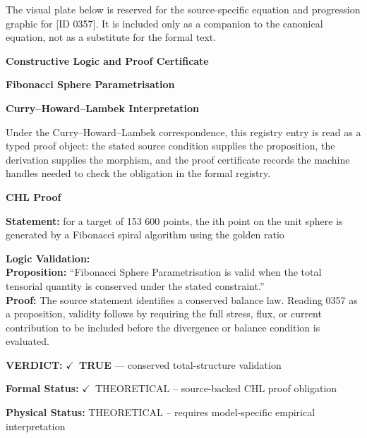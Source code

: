 \begingroup\footnotesize\sloppy
The visual plate below is reserved for the source-specific equation and progression graphic for [ID 0357]. It is included only as a companion to the canonical equation, not as a substitute for the formal text.
\par\endgroup
\ifTZPDarkEdition
{}
\fi

\clearpage
\begingroup\tzpsupportsetup
\noindent\textbf{\fontsize{10.8pt}{12.8pt}\selectfont [ID 0357] Constructive Logic and Proof Certificate}\par
\noindent\textbf{\fontsize{10pt}{12pt}\selectfont Fibonacci Sphere Parametrisation}\par
\vspace{0.45em}
\begingroup
\footnotesize
\setlength{\parskip}{0.22em}
\setlength{\parindent}{0pt}
\noindent\textbf{Curry--Howard--Lambek Interpretation}\par
Under the Curry--Howard--Lambek correspondence, this registry entry is read as a typed proof
object: the stated source condition supplies the proposition, the derivation supplies the
morphism, and the proof certificate records the machine handles needed to check the obligation
in the formal registry.

\vspace{0.45em}
\noindent\textbf{CHL Proof}\par
\textbf{Statement:} for a target of 153 600 points, the ith point on the unit sphere is generated by a
Fibonacci spiral algorithm using the golden ratio

\textbf{Logic Validation:}\\
\textbf{Proposition:} ``Fibonacci Sphere Parametrisation is valid when the total tensorial quantity is conserved
under the stated constraint.''\\
\textbf{Proof:} The source statement identifies a conserved balance law. Reading 0357 as a proposition,
validity follows by requiring the full stress, flux, or current contribution to be
included before the divergence or balance condition is evaluated.

\textbf{VERDICT:} \ensuremath{\checkmark}\ \textbf{TRUE} --- conserved total-structure validation

\textbf{Formal Status:} \ensuremath{\checkmark}\ THEORETICAL -- source-backed CHL proof obligation

\textbf{Physical Status:} THEORETICAL -- requires model-specific empirical interpretation
\par\vspace{0.45em}
\par
\ifTZPDarkEdition
{}
\fi
\endgroup
\endgroup
